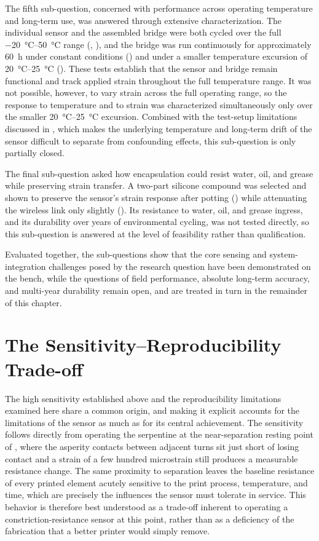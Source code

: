 The fifth sub-question, concerned with performance across operating temperature and long-term use, was answered through extensive characterization. The individual sensor and the assembled bridge were both cycled over the full \SIrange{-20}{50}{\celsius} range (, ), and the bridge was run continuously for approximately \SI{60}{\hour} under constant conditions () and under a smaller temperature excursion of \SIrange{20}{25}{\celsius} (). These tests establish that the sensor and bridge remain functional and track applied strain throughout the full temperature range. It was not possible, however, to vary strain across the full operating range, so the response to temperature and to strain was characterized simultaneously only over the smaller \SIrange{20}{25}{\celsius} excursion. Combined with the test-setup limitations discussed in , which makes the underlying temperature and long-term drift of the sensor difficult to separate from confounding effects, this sub-question is only partially closed.

The final sub-question asked how encapsulation could resist water, oil, and grease while preserving strain transfer. A two-part silicone compound was selected and shown to preserve the sensor's strain response after potting () while attenuating the wireless link only slightly (). Its resistance to water, oil, and grease ingress, and its durability over years of environmental cycling, was not tested directly, so this sub-question is answered at the level of feasibility rather than qualification.

Evaluated together, the sub-questions show that the core sensing and system-integration challenges posed by the research question have been demonstrated on the bench, while the questions of field performance, absolute long-term accuracy, and multi-year durability remain open, and are treated in turn in the remainder of this chapter.

\section{The Sensitivity–Reproducibility Trade-off} \label{sec:tradeoff}
The high sensitivity established above and the reproducibility limitations examined here share a common origin, and making it explicit accounts for the limitations of the sensor as much as for its central achievement. The sensitivity follows directly from operating the serpentine at the near-separation resting point of , where the asperity contacts between adjacent turns sit just short of losing contact and a strain of a few hundred microstrain still produces a measurable resistance change. The same proximity to separation leaves the baseline resistance of every printed element acutely sensitive to the print process, temperature, and time, which are precisely the influences the sensor must tolerate in service. This behavior is therefore best understood as a trade-off inherent to operating a constriction-resistance sensor at this point, rather than as a deficiency of the fabrication that a better printer would simply remove.

